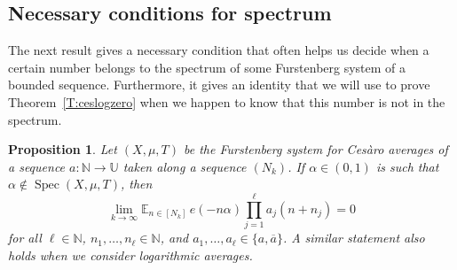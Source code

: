\documentclass[11pt]{amsart}
\newtheorem{proposition}[lemma]{Proposition}
\theoremstyle{definition}
\newcommand{\E}{{\mathbb E}}
\newcommand{\N}{{\mathbb N}}
\newcommand{\U}{{\mathbb U}}
\DeclareMathOperator{\spec}{Spec}
\begin{document}
\subsection{Necessary conditions for spectrum}
The next result gives  a necessary  condition that often helps us  decide when a certain number belongs to the spectrum of some Furstenberg system of a  bounded sequence.
Furthermore, it  gives an  identity that we will use to prove Theorem~\ref{T:ceslogzero} when we happen to know  that  this number is not in the spectrum.
\begin{proposition}\label{P:spectrum}
	Let $(X,\mu, T)$ be the Furstenberg system for Ces\`aro averages  of a sequence  $a\colon \N\to \U$ taken along a sequence
	$(N_k)$. If $\alpha\in (0,1)$ is such that $\alpha\not\in \spec(X,\mu, T)$, then
\begin{equation}\label{djoi}
	\lim_{k\to\infty} \E_{n\in[N_k]}\, e(-n\alpha) \prod_{j=1}^\ell a_j(n+n_j)=0
\end{equation}
	for all   $\ell\in \N$, $n_1,\ldots, n_\ell\in\N$, and  $a_1,\ldots, a_\ell\in \{a,\overline{a}\}$.
	A similar statement also holds when we consider logarithmic averages.
\end{proposition}
\end{document}
